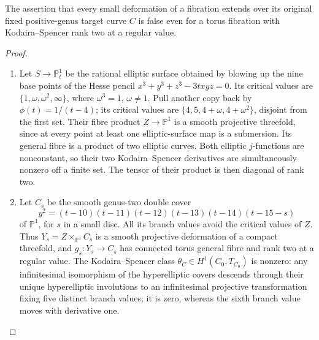 \begin{proposition}\hypertarget{tag-01GH}{}\label{cdp:st:E10}

The assertion that every small deformation of a fibration extends
over its original fixed positive-genus target curve $C$ is false even for a torus
fibration with Kodaira--Spencer rank two at a regular value.
\end{proposition}


\begin{proof}

\begin{enumerate}[label={$\langle1\rangle$\arabic*.},leftmargin=*]
\item Let $S\to\mathbb P^1_t$ be the rational elliptic surface obtained
by blowing up the nine base points of the Hesse pencil
$x^3+y^3+z^3-3txyz=0$. Its critical values are
$\{1,\omega,\omega^2,\infty\}$, where $\omega^3=1$, $\omega\ne1$.
Pull another copy back by $\phi(t)=1/(t-4)$; its critical values
are $\{4,5,4+\omega,4+\omega^2\}$, disjoint from the first set.
Their fibre product $Z\to\mathbb P^1$ is a smooth projective
threefold, since at every point at least one elliptic-surface
map is a submersion. Its general fibre is a product of two
elliptic curves. Both elliptic $j$-functions are nonconstant,
so their two Kodaira--Spencer derivatives are simultaneously
nonzero off a finite set. The tensor of their product is then
diagonal of rank two.

\item Let $C_s$ be the smooth genus-two double cover
\[
 y^2=(t-10)(t-11)(t-12)(t-13)(t-14)(t-15-s)
\]
of $\mathbb P^1$, for $s$ in a small disc. All its branch values
avoid the critical values of $Z$. Thus
$Y_s=Z\times_{\mathbb P^1}C_s$ is a smooth projective deformation
of a compact threefold, and $g_s:Y_s\to C_s$ has connected torus
general fibre and rank two at a regular value. The Kodaira--Spencer
class $\theta_C\in H^1(C_0,T_{C_0})$ is nonzero: any infinitesimal
isomorphism of the hyperelliptic covers descends through their
unique hyperelliptic involutions to an infinitesimal projective
transformation fixing five distinct branch values; it is zero,
whereas the sixth branch value moves with derivative one.


\end{enumerate}
\end{proof}
